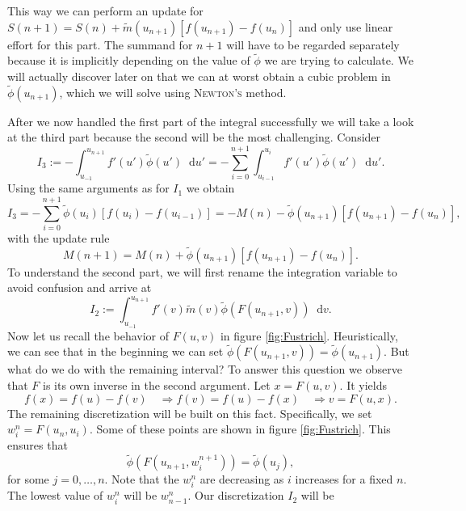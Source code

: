 \documentclass[12pt,a4paper,twoside, open=right]{scrreprt}
\theoremstyle{definition}
\theoremstyle{plain}
\newcommand{\D}{\mathop{}\!\mathrm{d}}
\begin{document}
This way we can perform an update for $S(n+1) = S(n)+\tilde{m}(u_{n+1})[f(u_{n+1})-f(u_n)]$ and  only use linear effort for this part. The summand for $n+1$ will have to be regarded separately because it is implicitly depending on the value of $\tilde\phi$ we are trying to calculate. We will actually discover later on that we can at worst obtain a cubic problem in $\tilde\phi(u_{n+1})$, which we will solve using \textsc{Newton's} method.
\par After we now handled the first part of the integral successfully we will take a look at the third part because the second will be the most challenging. Consider
\begin{equation}
    I_3:=-\int_{u_{-1}}^{u_{n+1}}f'(u')\tilde\phi(u')\D u' = -\sum_{i=0}^{n+1}\int_{u_{i-1}}^{u_i}f'(u')\tilde\phi(u')\D u'.
\end{equation} Using the same arguments as for $I_1$ we obtain
\begin{equation}
    I_3 = -\sum_{i=0}^{n+1}\tilde\phi(u_i)[f(u_i)-f(u_{i-1})] = -M(n) -\tilde\phi(u_{n+1})[f(u_{n+1})-f(u_{n})],
\end{equation}
with the update rule 
\begin{equation}
    M(n+1) = M(n) + \tilde\phi(u_{n+1})[f(u_{n+1})-f(u_{n})].
\end{equation}
To understand the second part, we will first rename the integration variable to avoid confusion and arrive at
\begin{equation}
    I_2:=\int_{u_{-1}}^{u_{n+1}}f'(v)\tilde{m}(v)\tilde{\phi}(F(u_{n+1},v))\D v.
\end{equation}
Now let us recall the behavior of $F(u,v)$ in figure \ref{fig:Fustrich}. Heuristically, we can see that in the beginning we can set $\tilde\phi(F(u_{n+1},v))=\tilde\phi(u_{n+1})$. But what do we do with the remaining interval? To answer this question we observe that $F$ is its own inverse in the second argument. Let $x = F(u,v)$. It yields
\begin{equation}
    f(x)=f(u)-f(v)\quad\Rightarrow f(v)=f(u)-f(x)\quad\Rightarrow v= F(u,x).
\end{equation}
The remaining discretization will be built on this fact. Specifically, we set $w_i^n=F(u_n,u_i)$. Some of these points are shown in figure \ref{fig:Fustrich}. This ensures that 
\begin{equation}
    \tilde\phi(F(u_{n+1},w^{n+1}_i))=\tilde{\phi}(u_j),
\end{equation}
for some $j=0,\dotsc,n$. Note that the $w_i^n$ are decreasing as $i$ increases for a fixed $n$. The lowest value of $w_i^n$ will be $w_{n-1}^n$. Our discretization $I_2$ will be 
\end{document}
